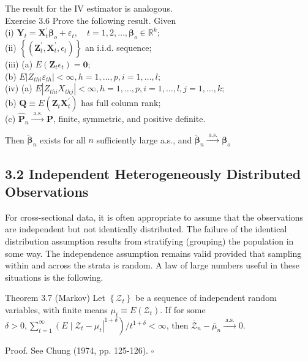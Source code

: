 \documentclass[10pt]{article}
\begin{document}
The result for the IV estimator is analogous.\\
Exercise 3.6 Prove the following result. Given\\
(i) $\mathbf{Y}_{t}=\mathbf{X}_{t}^{\prime} \boldsymbol{\beta}_{o}+\varepsilon_{t}, \quad t=1,2, \ldots, \boldsymbol{\beta}_{o} \in \mathbb{R}^{k} ;$\\
(ii) $\left\{\left(\mathbf{Z}_{t}^{\prime}, \mathbf{X}_{t}^{\prime}, \epsilon_{t}\right)\right\}$ an i.i.d. sequence;\\
(iii) (a) $E\left(\mathbf{Z}_{t} \epsilon_{t}\right)=\mathbf{0}$;\\
(b) $E\left|Z_{t h i} \varepsilon_{t h}\right|<\infty, h=1, \ldots, p, i=1, \ldots, l$;\\
(iv) (a) $E\left|Z_{t h i} X_{t h j}\right|<\infty, h=1, \ldots, p, i=1, \ldots, l, j=1, \ldots, k$;\\
(b) $\mathbf{Q} \equiv E\left(\mathbf{Z}_{t} \mathbf{X}_{t}^{\prime}\right)$ has full column rank;\\
(c) $\hat{\mathbf{P}}_{n} \xrightarrow{\text { a.s. }} \mathbf{P}$, finite, symmetric, and positive definite.

Then $\tilde{\boldsymbol{\beta}}_{n}$ exists for all $n$ sufficiently large a.s., and $\tilde{\boldsymbol{\beta}}_{n} \xrightarrow{\text { a.s. }} \boldsymbol{\beta}_{o}$

\subsection*{3.2 Independent Heterogeneously Distributed Observations}
For cross-sectional data, it is often appropriate to assume that the observations are independent but not identically distributed. The failure of the identical distribution assumption results from stratifying (grouping) the population in some way. The independence assumption remains valid provided that sampling within and across the strata is random. A law of large numbers useful in these situations is the following.

Theorem 3.7 (Markov) Let $\left\{\mathcal{Z}_{t}\right\}$ be a sequence of independent random variables, with finite means $\mu_{t} \equiv E\left(\mathcal{Z}_{t}\right)$. If for some $\delta>0, \sum_{t=1}^{\infty}\left(E \mid \mathcal{Z}_{t}-\right. \left.\left.\mu_{t}\right|^{1+\delta}\right) / t^{1+\delta}<\infty$, then $\overline{\mathcal{Z}}_{n}-\bar{\mu}_{n} \xrightarrow{\text { a.s. }} 0$.

Proof. See Chung (1974, pp. 125-126). \(\square\)
\end{document}
